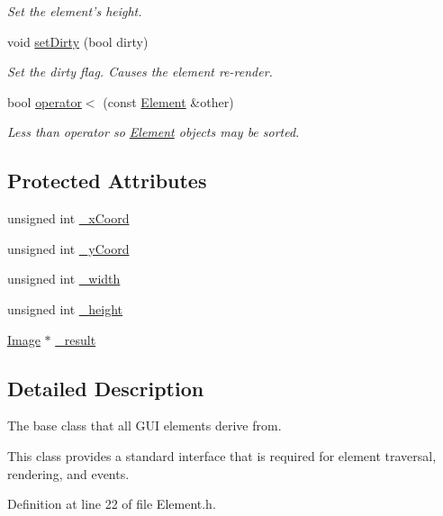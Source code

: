 \begin{DoxyCompactItemize}
\begin{DoxyCompactList}\small\item\em Set the element's height. \end{DoxyCompactList}\item 
void \hyperlink{class_element_aee4a1536e9e19eec9970522bb664550d}{set\-Dirty} (bool dirty)
\begin{DoxyCompactList}\small\item\em Set the dirty flag. Causes the element re-\/render. \end{DoxyCompactList}\item 
bool \hyperlink{class_element_aa931ea96e0f488ffe00b7bef715ef24c}{operator$<$} (const \hyperlink{class_element}{Element} \&other)
\begin{DoxyCompactList}\small\item\em Less than operator so \hyperlink{class_element}{Element} objects may be sorted. \end{DoxyCompactList}\end{DoxyCompactItemize}
\subsection*{Protected Attributes}
\begin{DoxyCompactItemize}
\item 
unsigned int \hyperlink{class_element_a53e4a4ffd5e4e60ce40f55f910d11f23}{\-\_\-x\-Coord}
\item 
unsigned int \hyperlink{class_element_ab7215197a138c164d0ab07d7632e2ef2}{\-\_\-y\-Coord}
\item 
unsigned int \hyperlink{class_element_a559a2b7894e65668aee75346a3976f86}{\-\_\-width}
\item 
unsigned int \hyperlink{class_element_a6118137bfca71319ebaaa0d87be60cf3}{\-\_\-height}
\item 
\hyperlink{class_image}{Image} $\ast$ \hyperlink{class_element_ac79e1d8bac0f2b6d23f9ae156d4b6cce}{\-\_\-result}
\end{DoxyCompactItemize}


\subsection{Detailed Description}
The base class that all G\-U\-I elements derive from. 

This class provides a standard interface that is required for element traversal, rendering, and events. 

Definition at line 22 of file Element.\-h.



